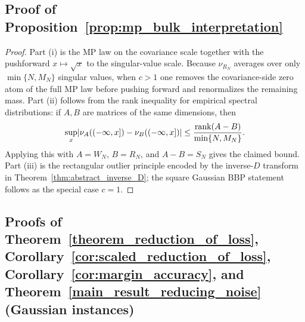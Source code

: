 \documentclass[11pt]{article}
\theoremstyle{plain}
\theoremstyle{definition}
\theoremstyle{remark}
\DeclarePairedDelimiter{\abs}{\lvert}{\rvert}
\newcommand{\rank}{\operatorname{rank}}
\newcommand{\1}{\mathbf{1}}
\begin{document}
\subsection{Proof of Proposition~\ref{prop:mp_bulk_interpretation}}

\begin{proof}
Part (i) is the MP law on the covariance scale together with the pushforward \(x\mapsto \sqrt x\) to the singular-value scale. Because \(\nu_{R_N}\) averages over only \(\min\{N,M_N\}\) singular values, when \(c>1\) one removes the covariance-side zero atom of the full MP law before pushing forward and renormalizes the remaining mass. Part (ii) follows from the rank inequality for empirical spectral distributions: if \(A,B\) are matrices of the same dimensions, then
\[
\sup_x \abs{\nu_A((-\infty,x])-\nu_B((-\infty,x])}
\le
\frac{\rank(A-B)}{\min\{N,M_N\}}.
\]
Applying this with \(A=W_N\), \(B=R_N\), and \(A-B=S_N\) gives the claimed bound. Part (iii) is the rectangular outlier principle encoded by the inverse-\(D\) transform in Theorem~\ref{thm:abstract_inverse_D}; the square Gaussian BBP statement follows as the special case \(c=1\).
\end{proof}

\subsection{Proofs of Theorem~\ref{theorem_reduction_of_loss}, Corollary~\ref{cor:scaled_reduction_of_loss}, Corollary~\ref{cor:margin_accuracy}, and Theorem~\ref{main_result_reducing_noise} (Gaussian instances)}
\end{document}

